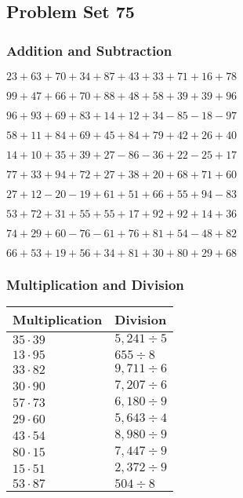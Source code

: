 \hypertarget{problem-set-75}{%
\subsection{Problem Set 75}\label{problem-set-75}}

\hypertarget{addition-and-subtraction}{%
\subsubsection{Addition and
Subtraction}\label{addition-and-subtraction}}

\(23+63+70+34+87+43+33+71+16+78\)

\(99+47+66+70+88+48+58+39+39+96\)

\(96+93+69+83+14+12+34-85-18-97\)

\(58+11+84+69+45+84+79+42+26+40\)

\(14+10+35+39+27-86-36+22-25+17\)

\(77+33+94+72+27+38+20+68+71+60\)

\(27+12-20-19+61+51+66+55+94-83\)

\(53+72+31+55+55+17+92+92+14+36\)

\(74+29+60-76-61+76+81+54-48+82\)

\(66+53+19+56+34+81+30+80+29+68\)

\hypertarget{multiplication-and-division}{%
\subsubsection{Multiplication and
Division}\label{multiplication-and-division}}

\begin{longtable}[]{@{}ll@{}}
\toprule
Multiplication & Division\tabularnewline
\midrule
\endhead
\(35\cdot39\) & \(5,241÷5\)\tabularnewline
\(13\cdot95\) & \(655÷8\)\tabularnewline
\(33\cdot82\) & \(9,711÷6\)\tabularnewline
\(30\cdot90\) & \(7,207÷6\)\tabularnewline
\(57\cdot73\) & \(6,180÷9\)\tabularnewline
\(29\cdot60\) & \(5,643÷4\)\tabularnewline
\(43\cdot54\) & \(8,980÷9\)\tabularnewline
\(80\cdot15\) & \(7,447÷9\)\tabularnewline
\(15\cdot51\) & \(2,372÷9\)\tabularnewline
\(53\cdot87\) & \(504÷8\)\tabularnewline
\bottomrule
\end{longtable}
